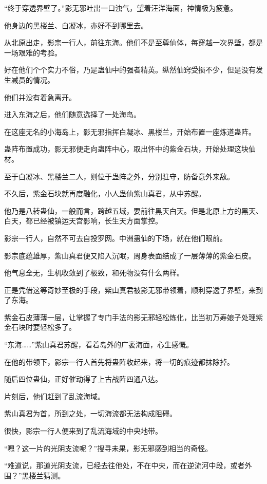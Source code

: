 
\begin{this_body}

“终于穿透界壁了。”影无邪吐出一口浊气，望着汪洋海面，神情极为疲惫。

他身边的黑楼兰、白凝冰，亦好不到哪里去。

从北原出走，影宗一行人，前往东海。他们不是至尊仙体，每穿越一次界壁，都是一场艰难的考验。

好在他们个个实力不俗，乃是蛊仙中的强者精英。纵然仙窍受损不少，但是没有发生减员的情况。

他们并没有着急离开。

进入东海之后，他们随意选择了一处海岛。

在这座无名的小海岛上，影无邪指挥白凝冰、黑楼兰，开始布置一座炼道蛊阵。

蛊阵布置成功，影无邪便走向蛊阵中心，取出怀中的紫金石块，开始处理这块仙材。

至于白凝冰、黑楼兰二人，则位于蛊阵之外，分别驻守，防备意外来敌。

不久后，紫金石块就再度融化，小人蛊仙紫山真君，从中苏醒。

他乃是八转蛊仙，一般而言，跨越五域，要前往黑天白天。但是北原上方的黑天、白天，都已经被镇运天宫影响，长生天方面掌控。

影宗一行人，自然不可去自投罗网。中洲蛊仙的下场，就在他们眼前。

影宗底蕴雄厚，紫山真君便又陷入沉眠，周身表面结成了一层薄薄的紫金石皮。

他气息全无，生机收敛到了极致，和死物没有什么两样。

正是凭借这等奇妙至极的手段，紫山真君被影无邪带领着，顺利穿透了界壁，来到了东海。

紫金石皮薄薄一层，让掌握了专门手法的影无邪轻松炼化，比当初万寿娘子处理紫金石块时要轻松多了。

“东海……”紫山真君苏醒，看着岛外的广袤海面，心生感慨。

在他的带领下，影宗一行人首先将蛊阵收起来，将一切的痕迹都抹除掉。

随后四位蛊仙，正好催动得了上古战阵四通八达。

片刻后，他们赶到了乱流海域。

紫山真君为首，所到之处，一切海流都无法构成阻碍。

很快，影宗一行人便来到了乱流海域的中央地带。

“嗯？这一片的光阴支流呢？”搜寻未果，影无邪感到相当的奇怪。

“难道说，那道光阴支流，已经去往他处，不在中央，而在逆流河中段，或者外围？”黑楼兰猜测。


\end{this_body}
